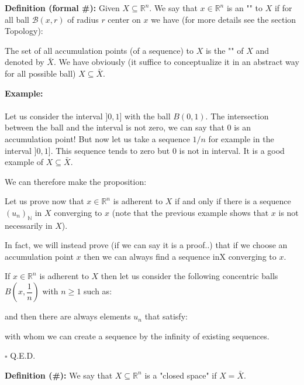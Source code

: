 	\textbf{Definition (formal \#\mydef):} Given $X \subseteq \mathbb{R}^n$. We say that $x\in \mathbb{R}^n$ is an "" to $X$ if for all ball $\mathcal{B}(x,r)$ of radius $r$ center on $x$ we have (for more details see the section Topology):
	
	The set of all accumulation points (of a sequence) to $X$ is the "" of $X$ and denoted by $\bar{X}$. We have obviously (it suffice to conceptualize it in an abstract way for all possible ball) $X \subseteq \bar{X}$.
	
	\begin{tcolorbox}[colframe=black,colback=white,sharp corners]
	\textbf{{\Large {}}Example:}\\\\
	Let us consider the interval $]0,1]$ with the ball $B (0,1)$. The intersection between the ball and the interval is not zero, we can say that $0$ is an accumulation point! But now let us take a sequence $1 / n$ for example in the interval $]0,1]$. This sequence tends to zero but $0$ is not in interval. It is a good example of $X \subseteq \bar{X}$.
	\end{tcolorbox}
	We can therefore make the proposition:
	\begin{theorem}
	Let us prove now that $x\in \mathbb{R}^n$ is adherent to $X$ if and only if there is a sequence $\left(u_n\right)_{\mathbb{N}}$ in $X$ converging to $x$ (note that the previous example shows that $x$ is not necessarily in $X$).
	
	In fact, we will instead prove (if we can say it is a proof..) that if we choose an accumulation point $x$ then we can always find a sequence in$ $X converging to $x$.
	\end{theorem}
	\begin{dem}
	If $x\in \mathbb{R}^n$ is adherent to $X$ then let us consider the following concentric balls $B\left(x,\dfrac{1}{n}\right)$ with $n\geq 1$ such as:
	
	and then there are always elements $u_n$ that satisfy:
	
	with whom we can create a sequence by the infinity of existing sequences.
	\begin{flushright}
		$\square$  Q.E.D.
	\end{flushright}
	\end{dem}	
	\textbf{Definition (\#\mydef):} We say that $X\subseteq \mathbb{R}^n$ is a "closed space" if $X=\bar{X}$.
	
